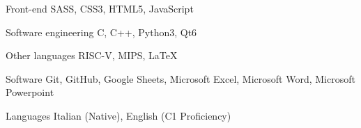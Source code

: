 

\begin{cvskills}

  \cvskill
    {Front-end} %
    {SASS, CSS3, HTML5, JavaScript} %

  \cvskill
    {Software engineering} %
    {C, C++, Python3, Qt6} %

  \cvskill
    {Other languages} %
    {RISC-V, MIPS, LaTeX} %

  \cvskill
    {Software} %
    {Git, GitHub, Google Sheets, Microsoft Excel, Microsoft Word, Microsoft Powerpoint} %

  \cvskill
    {Languages} %
    {Italian (Native), English (C1 Proficiency)} %

\end{cvskills}
